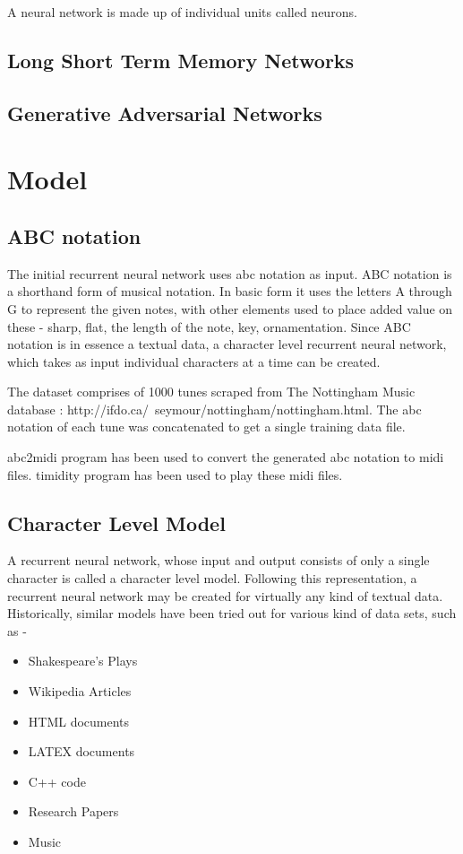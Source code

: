 \documentclass[11pt]{article}
\begin{document}
A neural network is made up of individual units called neurons.

\subsection{Long Short Term Memory Networks}

\subsection{Generative Adversarial Networks}
\section{Model}
\subsection{ABC notation}
The initial recurrent neural network uses abc notation as input. ABC notation is a shorthand form of musical notation. In basic form it uses the letters A through G to represent the given notes, with other elements used to place added value on these - sharp, flat, the length of the note, key, ornamentation. Since ABC notation is in essence a textual data, a character level recurrent neural network, which takes as input individual characters at a time can be created.

The dataset comprises of 1000 tunes scraped from The Nottingham Music database : http://ifdo.ca/~seymour/nottingham/nottingham.html. The abc notation of each tune was concatenated to get a single training data file.

abc2midi program has been used to convert the generated abc notation to midi files. timidity program has been used to play these midi files.

\subsection{Character Level Model}
A recurrent neural network, whose input and output consists of only a single character is called a character level model. Following this representation, a recurrent neural network may be created for virtually any kind of textual data. Historically, similar models have been tried out for various kind of data sets, such as -
\begin{itemize}
\item Shakespeare's Plays
\item Wikipedia Articles
\item HTML documents
\item LATEX documents
\item C++ code
\item Research Papers
\item Music
\end{itemize}
\end{document}
